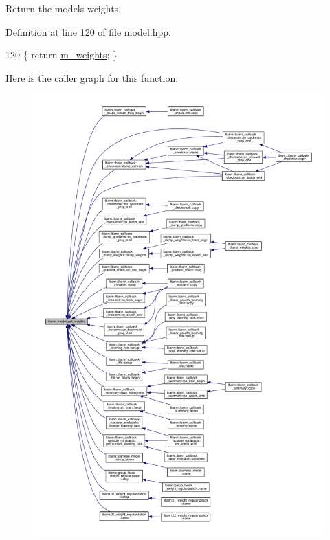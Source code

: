 Return the model\textquotesingle{}s weights. 

Definition at line 120 of file model.\+hpp.


\begin{DoxyCode}
120 \{ \textcolor{keywordflow}{return} \hyperlink{classlbann_1_1model_aaf9adefe4497d90bf5bc2567e71bfb00}{m\_weights}; \}
\end{DoxyCode}
Here is the caller graph for this function\+:\nopagebreak
\begin{figure}[H]
\begin{center}
\leavevmode
\includegraphics[width=350pt]{classlbann_1_1model_ac0a89794f1f51e7c502fff2745c973e6_icgraph}
\end{center}
\end{figure}
\mbox{\label{classlbann_1_1model_a2c82c9def03b1c60e48f52fca7708833}} 
